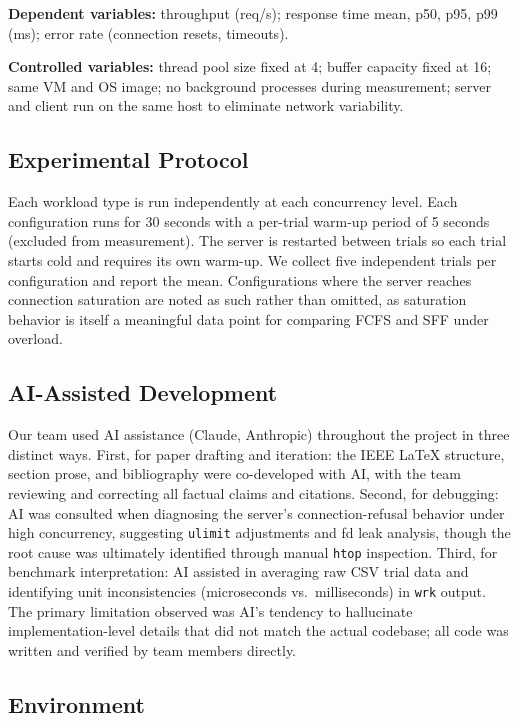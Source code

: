 \documentclass[conference]{IEEEtran}
\begin{document}
\textbf{Dependent variables:} throughput (req/s); response time mean, p50,
p95, p99 (ms); error rate (connection resets, timeouts).

\textbf{Controlled variables:} thread pool size fixed at 4; buffer capacity
fixed at 16; same VM and OS image; no background processes during measurement;
server and client run on the same host to eliminate network variability.

\subsection{Experimental Protocol}

Each workload type is run independently at each concurrency level. Each
configuration runs for 30 seconds with a per-trial warm-up period of 5
seconds (excluded from measurement). The server is restarted between trials
so each trial starts cold and requires its own warm-up. We collect five
independent trials per configuration and report the mean. Configurations
where the server reaches connection saturation are noted as such rather than
omitted, as saturation behavior is itself a meaningful data point for
comparing FCFS and SFF under overload.

\subsection{AI-Assisted Development}

Our team used AI assistance (Claude, Anthropic) throughout the project in
three distinct ways. First, for paper drafting and iteration: the IEEE
LaTeX structure, section prose, and bibliography were co-developed with AI,
with the team reviewing and correcting all factual claims and citations.
Second, for debugging: AI was consulted when diagnosing the server's
connection-refusal behavior under high concurrency, suggesting \texttt{ulimit}
adjustments and fd leak analysis, though the root cause was ultimately
identified through manual \texttt{htop} inspection. Third, for benchmark
interpretation: AI assisted in averaging raw CSV trial data and identifying
unit inconsistencies (microseconds vs.\ milliseconds) in \texttt{wrk} output.
The primary limitation observed was AI's tendency to hallucinate
implementation-level details that did not match the actual codebase;
all code was written and verified by team members directly.

\subsection{Environment}
\end{document}
